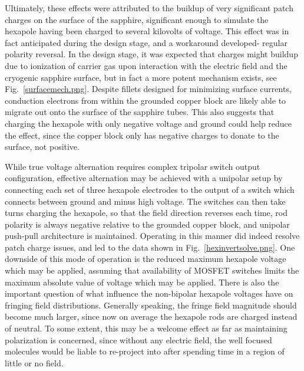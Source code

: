 Ultimately, these effects were attributed to the buildup of very significant patch charges on the surface of the sapphire, significant enough to simulate the hexapole having been charged to several kilovolts of voltage.
This effect was in fact anticipated during the design stage, and a workaround developed- regular polarity reversal.
In the design stage, it was expected that charges might buildup due to ionization of carrier gas upon interaction with the electric field and the cryogenic sapphire surface, but in fact a more potent mechanism exists, see Fig.~\ref{surfacemech.png}.
Despite fillets designed for minimizing surface currents, conduction electrons from within the grounded copper block are likely able to migrate out onto the surface of the sapphire tubes.
This also suggests that charging the hexapole with only negative voltage and ground could help reduce the effect, since the copper block only has negative charges to donate to the surface, not positive.


While true voltage alternation requires complex tripolar switch output configuration, effective alternation may be achieved with a unipolar setup by connecting each set of three hexapole electrodes to the output of a switch which connects between ground and minus high voltage.
The switches can then take turns charging the hexapole, so that the field direction reverses each time, rod polarity is always negative relative to the grounded copper block, and unipolar push-pull architecture is maintained.
Operating in this manner did indeed resolve patch charge issues, and led to the data shown in Fig.~\ref{hexinvertsolve.png}.
One downside of this mode of operation is the reduced maximum hexapole voltage which may be applied, assuming that availability of MOSFET switches limits the maximum absolute value of voltage which may be applied.
There is also the important question of what influence the non-bipolar hexapole voltages have on fringing field distributions.
Generally speaking, the fringe field magnitude should become much larger, since now on average the hexapole rods are charged instead of neutral.
To some extent, this may be a welcome effect as far as maintaining polarization is concerned, since without any electric field, the well focused  molecules would be liable to re-project into  after spending time in a region of little or no field.


